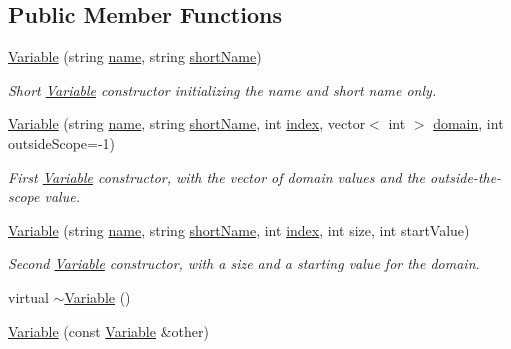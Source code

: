 \subsection*{Public Member Functions}
\begin{DoxyCompactItemize}
\item 
\hyperlink{classghost_1_1Variable_aafa0f9dc2f424822ffb3bb3114f906bf}{Variable} (string \hyperlink{classghost_1_1Variable_a05cf4a4cd3a5c033028e0b0f11d1dafd}{name}, string \hyperlink{classghost_1_1Variable_afb5eb79a7f6351b4305fe082699b6d7d}{short\+Name})
\begin{DoxyCompactList}\small\item\em Short \hyperlink{classghost_1_1Variable}{Variable} constructor initializing the name and short name only. \end{DoxyCompactList}\item 
\hyperlink{classghost_1_1Variable_a5168fd9c37c246e1edd905ddb3da0c61}{Variable} (string \hyperlink{classghost_1_1Variable_a05cf4a4cd3a5c033028e0b0f11d1dafd}{name}, string \hyperlink{classghost_1_1Variable_afb5eb79a7f6351b4305fe082699b6d7d}{short\+Name}, int \hyperlink{classghost_1_1Variable_a934efa463fb1897b4266040e321dbc41}{index}, vector$<$ int $>$ \hyperlink{classghost_1_1Variable_a9dbda868fa47e4353f30461e89ff8020}{domain}, int outside\+Scope=-\/1)
\begin{DoxyCompactList}\small\item\em First \hyperlink{classghost_1_1Variable}{Variable} constructor, with the vector of domain values and the outside-\/the-\/scope value. \end{DoxyCompactList}\item 
\hyperlink{classghost_1_1Variable_a1657c8e21fb8ef1b8f9b0a0c3132192b}{Variable} (string \hyperlink{classghost_1_1Variable_a05cf4a4cd3a5c033028e0b0f11d1dafd}{name}, string \hyperlink{classghost_1_1Variable_afb5eb79a7f6351b4305fe082699b6d7d}{short\+Name}, int \hyperlink{classghost_1_1Variable_a934efa463fb1897b4266040e321dbc41}{index}, int size, int start\+Value)
\begin{DoxyCompactList}\small\item\em Second \hyperlink{classghost_1_1Variable}{Variable} constructor, with a size and a starting value for the domain. \end{DoxyCompactList}\item 
virtual \hyperlink{classghost_1_1Variable_ab556bb79ef92364bd820022394c967dd}{$\sim$\+Variable} ()
\item 
\hyperlink{classghost_1_1Variable_ac9fb0513e1d15a047816821e034589ea}{Variable} (const \hyperlink{classghost_1_1Variable}{Variable} \&other)

\end{DoxyCompactItemize}
